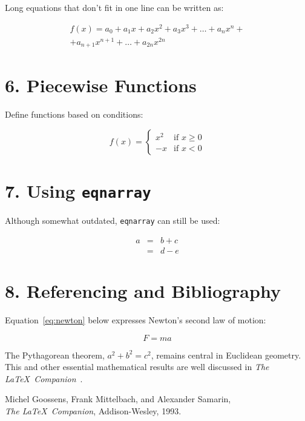 \documentclass[12pt]{article}
\begin{document}
Long equations that don’t fit in one line can be written as:

\begin{multline}
f(x) = a_0 + a_1x + a_2x^2 + a_3x^3 + \dots + a_nx^n + \\
+ a_{n+1}x^{n+1} + \dots + a_{2n}x^{2n}
\end{multline}

\section*{6. Piecewise Functions}

Define functions based on conditions:

\begin{equation}
f(x) = \begin{cases}
x^2 & \text{if } x \geq 0 \\
-x & \text{if } x < 0
\end{cases}
\end{equation}

\section*{7. Using \texttt{eqnarray}}

Although somewhat outdated, \texttt{eqnarray} can still be used:

\begin{eqnarray}
a &=& b + c \\
  &=& d - e
\end{eqnarray}

\section*{8. Referencing and Bibliography}

Equation~\ref{eq:newton} below expresses Newton's second law of motion:

\begin{equation}
F = ma
\label{eq:newton}
\end{equation}

The Pythagorean theorem, \( a^2 + b^2 = c^2 \), remains central in Euclidean geometry. This and other essential mathematical results are well discussed in \textit{The \LaTeX\ Companion}~\cite{latexcompanion}.

\begin{thebibliography}{9}
Michel Goossens, Frank Mittelbach, and Alexander Samarin,\\
\textit{The \LaTeX\ Companion}, Addison-Wesley, 1993.
\end{thebibliography}
\end{document}
